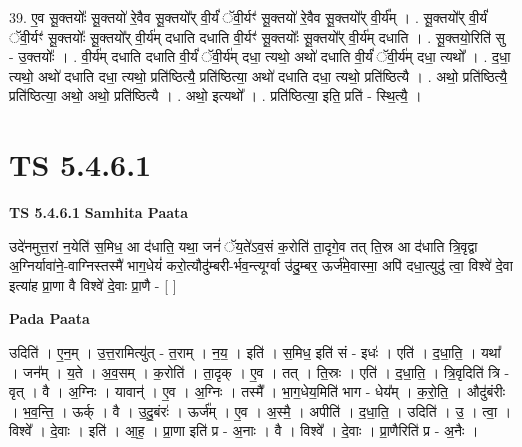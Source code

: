 \documentclass[17pt]{extarticle}
\begin{document}
39. ए॒व सू॒क्तयोः᳚ सू॒क्तयो॑ रे॒वैव सू॒क्तयो᳚र् वी॒र्यं॑ ॅवी॒र्यꣳ॑ सू॒क्तयो॑ रे॒वैव सू॒क्तयो᳚र् वी॒र्य᳚म् । . सू॒क्तयो᳚र् वी॒र्यं॑ ॅवी॒र्यꣳ॑ सू॒क्तयोः᳚ सू॒क्तयो᳚र् वी॒र्य॑म् दधाति दधाति वी॒र्यꣳ॑ सू॒क्तयोः᳚ सू॒क्तयो᳚र् वी॒र्य॑म् दधाति । . सू॒क्तयो॒रिति॑ सु - उ॒क्तयोः᳚ । . वी॒र्य॑म् दधाति दधाति वी॒र्यं॑ ॅवी॒र्य॑म् दधा॒ त्यथो॒ अथो॑ दधाति वी॒र्यं॑ ॅवी॒र्य॑म् दधा॒ त्यथो᳚ । . द॒धा॒ त्यथो॒ अथो॑ दधाति दधा॒ त्यथो॒ प्रति॑ष्ठित्यै॒ प्रति॑ष्ठित्या॒ अथो॑ दधाति दधा॒ त्यथो॒ प्रति॑ष्ठित्यै । . अथो॒ प्रति॑ष्ठित्यै॒ प्रति॑ष्ठित्या॒ अथो॒ अथो॒ प्रति॑ष्ठित्यै । . अथो॒ इत्यथो᳚ । . प्रति॑ष्ठित्या॒ इति॒ प्रति॑ - स्थि॒त्यै॒ । \newline
\pagebreak
{}

\section{ TS 5.4.6.1 }

\textbf{TS 5.4.6.1 } \newline
\textbf{Samhita Paata} \newline

उदे॑नमुत्त॒रां न॒येति॑ स॒मिध॒ आ द॑धाति॒ यथा॒ जनं॑ ॅय॒ते॑ऽव॒सं क॒रोति॑ ता॒दृगे॒व तत् ति॒स्र आ द॑धाति त्रि॒वृद्वा अ॒ग्निर्यावा॑ने॒-वाग्निस्तस्मै॑ भाग॒धेयं॑ करो॒त्यौदु॑म्बरी-र्भव॒न्त्यूर्ग्वा उ॑दु॒म्बर॒ ऊर्ज॑मे॒वास्मा॒ अपि॑ दधा॒त्युदु॑ त्वा॒ विश्वे॑ दे॒वा इत्या॑ह प्रा॒णा वै विश्वे॑ दे॒वाः प्रा॒णै - [  ] \newline

\textbf{Pada Paata} \newline

उदिति॑ । ए॒न॒म् । उ॒त्त॒रामित्यु॑त् - त॒राम् । न॒य॒ । इति॑ । स॒मिध॒ इति॑ सं - इधः॑ । एति॑ । द॒धा॒ति॒ । यथा᳚ । जन᳚म् । य॒ते । अ॒व॒सम् । क॒रोति॑ । ता॒दृक् । ए॒व । तत् । ति॒स्रः । एति॑ । द॒धा॒ति॒ । त्रि॒वृदिति॑ त्रि - वृत् । वै । अ॒ग्निः । यावान्॑ । ए॒व । अ॒ग्निः । तस्मै᳚ । भा॒ग॒धेय॒मिति॑ भाग - धेय᳚म् । क॒रो॒ति॒ । औदु॑बंरीः । भ॒व॒न्ति॒ । ऊर्क् । वै । उ॒दु॒बंरः॑ । ऊर्ज᳚म् । ए॒व । अ॒स्मै॒ । अपीति॑ । द॒धा॒ति॒ । उदिति॑ । उ॒ । त्वा॒ । विश्वे᳚ । दे॒वाः । इति॑ । आ॒ह॒ । प्रा॒णा इति॑ प्र - अ॒नाः । वै । विश्वे᳚ । दे॒वाः । प्रा॒णैरिति॑ प्र - अ॒नैः ।  \newline
\end{document}
